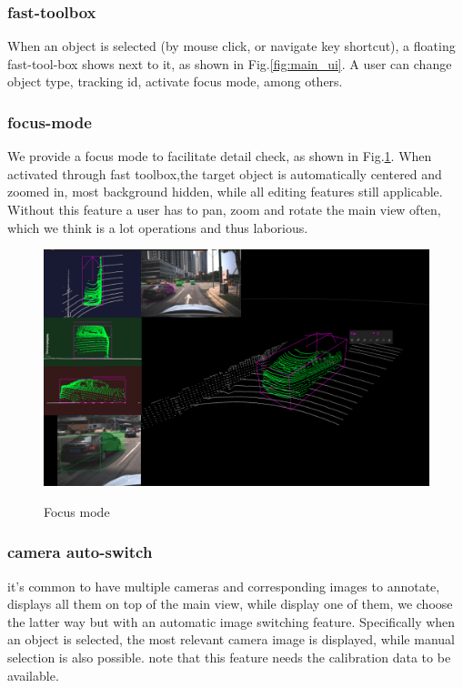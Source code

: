 \documentclass[letterpaper, 10 pt, conference]{ieeeconf}  %
\begin{document}
\subsubsection{fast-toolbox}
When an object is selected (by mouse click, or navigate key shortcut), a floating fast-tool-box shows next to it, as shown in Fig.\ref{fig:main_ui}. A user can change object type, tracking id, activate focus mode, among others.

\subsubsection{focus-mode}
We provide a focus mode to facilitate detail check, as shown in Fig.\ref{fig:focus-mode}. When activated through fast toolbox,the target object is automatically centered and zoomed in, most background hidden, while all editing features still applicable. Without this feature a user has to pan,  zoom and rotate the main view often, which we think is a lot operations and thus laborious.

\begin{figure}[thpb]
	\centering	
	\includegraphics[width=0.9\linewidth]{./figures/focus-mode}\\
	\caption{Focus mode}
	\label{fig:focus-mode}
\end{figure}


\subsubsection{camera auto-switch}
it's common to have multiple cameras and corresponding images to annotate, \cite{Zimmer20193DBA} displays all them on top of the main view, while \cite{} display one of them, we choose the latter way but with an automatic image switching feature. Specifically when an object is selected, the most relevant camera image is displayed, while manual selection is also possible.
note that this feature needs the calibration data to be available.
\end{document}
